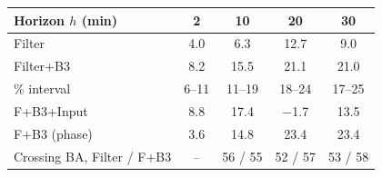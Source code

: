 \begin{tabular}{lcccc}
\toprule
Horizon $h$ (min) & 2 & 10 & 20 & 30 \\
\midrule
Filter & 4.0 & 6.3 & 12.7 & 9.0 \\
Filter+B3 & 8.2 & 15.5 & 21.1 & 21.0 \\
\quad 95\% interval & 6--11 & 11--19 & 18--24 & 17--25 \\
F+B3+Input & 8.8 & 17.4 & $-$1.7 & 13.5 \\
F+B3 (phase) & 3.6 & 14.8 & 23.4 & 23.4 \\
\midrule
Crossing BA, Filter / F+B3 & -- & 56 / 55 & 52 / 57 & 53 / 58 \\
\bottomrule
\end{tabular}
